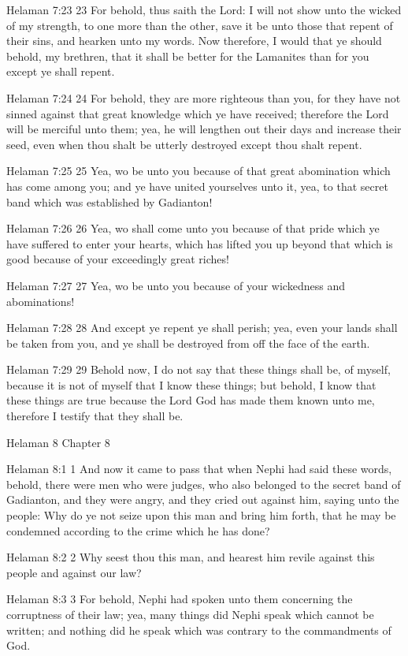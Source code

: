 Helaman 7:23
 23 For behold, thus saith the Lord: I will not show unto the
wicked of my strength, to one more than the other, save it be
unto those that repent of their sins, and hearken unto my words.
Now therefore, I would that ye should behold, my brethren, that
it shall be better for the Lamanites than for you except ye shall
repent.

Helaman 7:24
 24 For behold, they are more righteous than you, for they have
not sinned against that great knowledge which ye have received;
therefore the Lord will be merciful unto them; yea, he will
lengthen out their days and increase their seed, even when thou
shalt be utterly destroyed except thou shalt repent.

Helaman 7:25
 25 Yea, wo be unto you because of that great abomination which
has come among you; and ye have united yourselves unto it, yea,
to that secret band which was established by Gadianton!

Helaman 7:26
 26 Yea, wo shall come unto you because of that pride which ye
have suffered to enter your hearts, which has lifted you up
beyond that which is good because of your exceedingly great
riches!

Helaman 7:27
 27 Yea, wo be unto you because of your wickedness and
abominations!

Helaman 7:28
 28 And except ye repent ye shall perish; yea, even your lands
shall be taken from you, and ye shall be destroyed from off the
face of the earth.

Helaman 7:29
 29 Behold now, I do not say that these things shall be, of
myself, because it is not of myself that I know these things; but
behold, I know that these things are true because the Lord God
has made them known unto me, therefore I testify that they shall
be.

Helaman 8
Chapter 8

Helaman 8:1
 1 And now it came to pass that when Nephi had said these words,
behold, there were men who were judges, who also belonged to the
secret band of Gadianton, and they were angry, and they cried out
against him, saying unto the people: Why do ye not seize upon
this man and bring him forth, that he may be condemned according
to the crime which he has done?

Helaman 8:2
 2 Why seest thou this man, and hearest him revile against this
people and against our law?

Helaman 8:3
 3 For behold, Nephi had spoken unto them concerning the
corruptness of their law; yea, many things did Nephi speak which
cannot be written; and nothing did he speak which was contrary to
the commandments of God.

